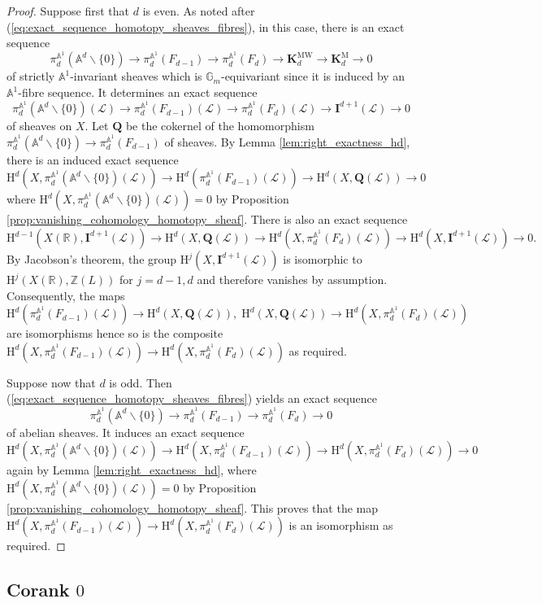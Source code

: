 \documentclass[11pt,leqno]{amsart}
\renewcommand{\1}{{\rm 1\hspace*{-0.4ex}%
\rule{0.1ex}{1.52ex}\hspace*{0.2ex}}}
\newcommand{\gm}[1]{{{\mathbb G}_{m}^{#1}}}
\newcommand{\Gm}{{\gm{}}}
\renewcommand{\Lc}{{\mathcal L}}
\newcommand{\Hr}{{\mathrm {H}}}
\newcommand{\<}[1]{{\langle}#1 {\rangle}}
\newcommand{\Ibf}{\mathbf{I}}
\newcommand{\Rb}{\mathbb{R}}
\newcommand{\Zb}{\mathbb{Z}}
\newcommand{\Kbf}{\mathbf{K}}
\newcommand{\Abb}{\mathbb{A}}
\newcommand{\Mr}{\mathrm{M}}
\newcommand{\MW}{\mathrm{MW}}
\newcommand{\Qbf}{\mathbf{Q}}
\theoremstyle{plain}
\theoremstyle{definition}
\theoremstyle{remark}
\numberwithin{equation}{section}
\begin{document}
\begin{proof}
Suppose first that $d$ is even. As noted after (\ref{eq:exact_sequence_homotopy_sheaves_fibres}), in this case, there is an exact sequence \[\pi_d^{\Abb^1}(\Abb^d\smallsetminus \{0\})\to\pi_d^{\Abb^1}(F_{d-1})\to\pi_d^{\Abb^1}(F_d)\to\Kbf_d^\MW\to\Kbf_d^\Mr\to 0\] of strictly $\Abb^1$-invariant sheaves which is $\Gm$-equivariant since it is induced by an $\Abb^1$-fibre sequence. It determines an exact sequence \[\pi_d^{\Abb^1}(\Abb^d\smallsetminus \{0\})(\Lc)\to\pi_d^{\Abb^1}(F_{d-1})(\Lc)\to\pi_d^{\Abb^1}(F_d)(\Lc)\to\Ibf^{d+1}(\Lc)\to 0\] of sheaves on $X$. Let $\Qbf$ be the cokernel of the homomorphism $\pi_d^{\Abb^1}(\Abb^d\smallsetminus \{0\})\to\pi_d^{\Abb^1}(F_{d-1})$ of sheaves. By Lemma \ref{lem:right_exactness_hd}, there is an induced exact sequence \[\Hr^d(X,\pi_d^{\Abb^1}(\Abb^d\smallsetminus \{0\})(\Lc))\to\Hr^d(\pi_d^{\Abb^1}(F_{d-1})(\Lc))\to\Hr^d(X,\Qbf(\Lc))\to 0\] where $\Hr^d(X,\pi_d^{\Abb^1}(\Abb^d\smallsetminus \{0\})(\Lc))=0$ by Proposition \ref{prop:vanishing_cohomology_homotopy_sheaf}. There is also an exact sequence \[\Hr^{d-1}(X(\Rb),\Ibf^{d+1}(\Lc))\to\Hr^d(X,\Qbf(\Lc))\to\Hr^d(X,\pi_d^{\Abb^1}(F_d)(\Lc))\to\Hr^d(X,\Ibf^{d+1}(\Lc))\to 0.\] By Jacobson's theorem, the group $\Hr^j(X,\Ibf^{d+1}(\Lc))$ is isomorphic to $\Hr^j(X(\Rb),\Zb(L))$ for $j=d-1,d$ and therefore vanishes by assumption. Consequently, the maps \[\Hr^d(\pi_d^{\Abb^1}(F_{d-1})(\Lc))\to\Hr^d(X,\Qbf(\Lc)),\;\Hr^d(X,\Qbf(\Lc))\to\Hr^d(X,\pi_d^{\Abb^1}(F_d)(\Lc))\] are isomorphisms hence so is the composite $\Hr^d(X,\pi_d^{\Abb^1}(F_{d-1})(\Lc))\to\Hr^d(X,\pi_d^{\Abb^1}(F_d)(\Lc))$ as required.

Suppose now that $d$ is odd. Then (\ref{eq:exact_sequence_homotopy_sheaves_fibres}) yields an exact sequence \[\pi_{d}^{\Abb^1}(\Abb^d\smallsetminus \{0\})\to\pi_d^{\Abb^1}(F_{d-1})\to\pi_d^{\Abb^1}(F_d)\to 0\] of abelian sheaves. It induces an exact sequence \[\Hr^d(X,\pi_d^{\Abb^1}(\Abb^d\smallsetminus \{0\})(\Lc))\to\Hr^d(X,\pi_d^{\Abb^1}(F_{d-1})(\Lc))\to\Hr^d(X,\pi_d^{\Abb^1}(F_d)(\Lc))\to 0\] again by Lemma \ref{lem:right_exactness_hd}, where $\Hr^d(X,\pi_d^{\Abb^1}(\Abb^d\smallsetminus \{0\})(\Lc))=0$ by Proposition \ref{prop:vanishing_cohomology_homotopy_sheaf}. This proves that the map $\Hr^d(X,\pi_d^{\Abb^1}(F_{d-1})(\Lc))\to\Hr^d(X,\pi_d^{\Abb^1}(F_d)(\Lc))$ is an isomorphism as required.
\end{proof}

\subsection{Corank $0$}
\end{document}
